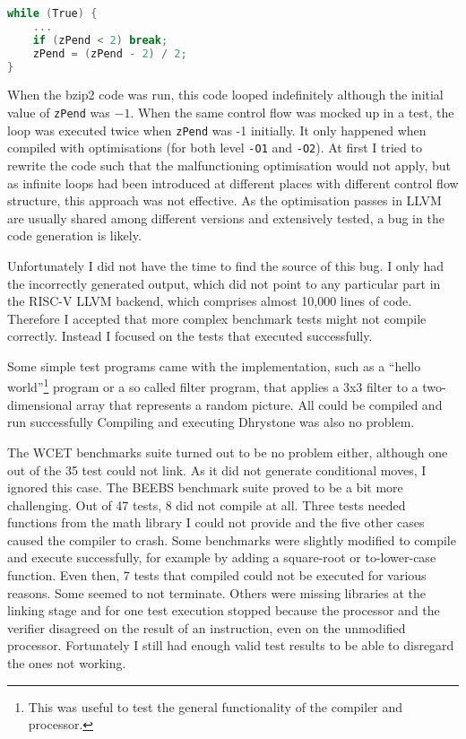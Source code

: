 \documentclass[12pt,twoside,notitlepage]{report}
\begin{document}
\begin{lstlisting}[language=C, label={faulty_c_code}, caption={Example C code that will compile incorrectly if compiled with the RISC-V LLVM and optimisations enabled}]
while (True) {
	...
	if (zPend < 2) break;
	zPend = (zPend - 2) / 2;
}
\end{lstlisting}

When the bzip2 code was run, this code looped indefinitely although the initial value of \texttt{zPend} was $-1$. When the same control flow was mocked up in a test, the loop was executed twice when \texttt{zPend} was -1 initially. It only happened when compiled with optimisations (for both level \texttt{-O1} and \texttt{-O2}). At first I tried to rewrite the code such that the malfunctioning optimisation would not apply, but as infinite loops had been introduced at different places with different control flow structure, this approach was not effective. As the optimisation passes in LLVM are usually shared among different versions and extensively tested, a bug in the code generation is likely.

Unfortunately I did not have the time to find the source of this bug. I only had the incorrectly generated output, which did not point to any particular part in the RISC-V LLVM backend, which comprises almost 10,000 lines of code. Therefore I accepted that more complex benchmark tests might not compile correctly. Instead I focused on the tests that executed successfully.

Some simple test programs came with the implementation, such as a ``hello world''\footnote{This was useful to test the general functionality of the compiler and processor.} program or a so called filter program, that applies a 3x3 filter to a two-dimensional array that represents a random picture. All could be compiled and run successfully
Compiling and executing Dhrystone was also no problem.

The WCET benchmarks suite turned out to be no problem either, although one out of the 35 test could not link. As it did not generate conditional moves, I ignored this case. The BEEBS benchmark suite proved to be a bit more challenging. Out of 47 tests, 8 did not compile at all. Three tests needed functions from the math library I could not provide and the five other cases caused the compiler to crash. Some benchmarks were slightly modified to compile and execute successfully, for example by adding a square-root or to-lower-case function. Even then, 7 tests that compiled could not be executed for various reasons. Some seemed to not terminate. Others were missing libraries at the linking stage and for one test execution stopped because the processor and the verifier disagreed on the result of an instruction, even on the unmodified processor. Fortunately I still had enough valid test results to be able to disregard the ones not working. 
\end{document}
